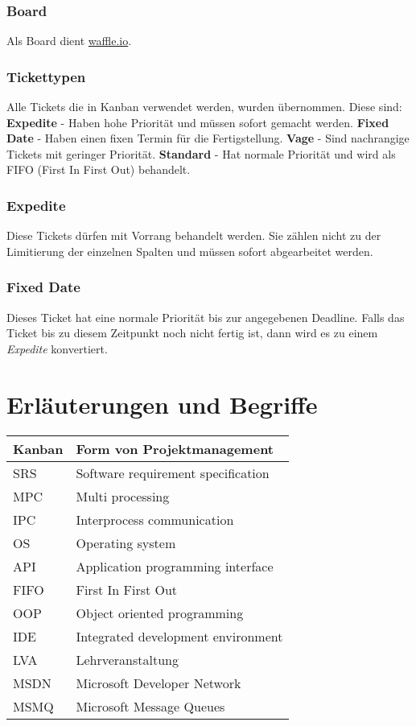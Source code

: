 \documentclass[a4paper]{book}
\begin{document}
\subsubsection{Board}
Als Board dient \href{https://waffle.io/chronos38/libipc-}{waffle.io}.

\subsubsection{Tickettypen}
Alle Tickets die in Kanban verwendet werden, wurden übernommen. Diese sind:\newline
\textbf{Expedite} - Haben hohe Priorität und müssen sofort gemacht werden.\newline
\textbf{Fixed Date} - Haben einen fixen Termin für die Fertigstellung.\newline
\textbf{Vage} - Sind nachrangige Tickets mit geringer Priorität.\newline
\textbf{Standard} - Hat normale Priorität und wird als FIFO (First In First Out) behandelt.

\subsubsection{Expedite}
Diese Tickets dürfen mit Vorrang behandelt werden. Sie zählen nicht zu der Limitierung der einzelnen Spalten und müssen sofort abgearbeitet werden.

\subsubsection{Fixed Date}
Dieses Ticket hat eine normale Priorität bis zur angegebenen Deadline. Falls das Ticket bis zu diesem Zeitpunkt noch nicht fertig ist, dann wird es zu einem \textit{Expedite} konvertiert.

\section{Erläuterungen und Begriffe}
\begin{center}
\begin{longtable}{|p{3cm}|p{8cm}|}
\hline
Kanban & Form von Projektmanagement \\
\hline
SRS & Software requirement specification \\
\hline
MPC & Multi processing \\
\hline
IPC & Interprocess communication \\
\hline
OS & Operating system \\
\hline
API & Application programming interface \\
\hline
FIFO & First In First Out \\
\hline
OOP & Object oriented programming \\
\hline
IDE & Integrated development environment \\
\hline
LVA & Lehrveranstaltung \\
\hline
MSDN & Microsoft Developer Network \\
\hline
MSMQ & Microsoft Message Queues \\
\hline
\end{longtable}
\end{center}
\end{document}
